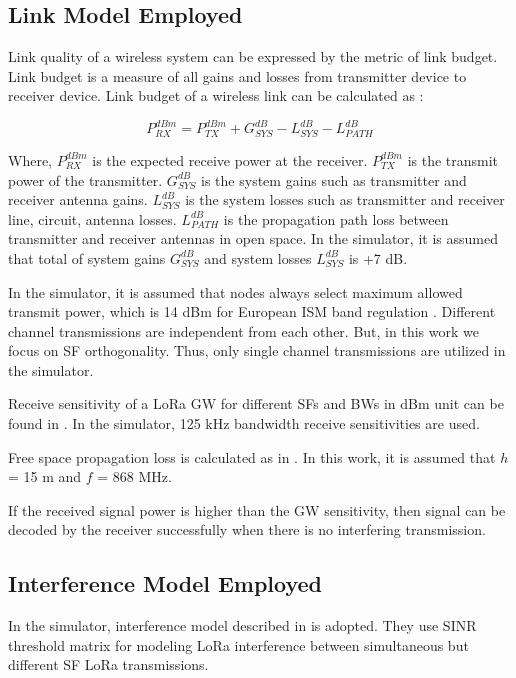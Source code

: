 \documentclass[conference]{IEEEtran}
\begin{document}
\subsection{Link Model Employed}
\par Link quality of a wireless system can be expressed by the metric of link budget. Link budget is a measure of all gains and losses from transmitter device to receiver device. Link budget of a wireless link can be calculated as \cite{AN1200.22}:

\begin{equation} \label{eq:expected_rx_power}
P^{dBm}_{RX} = P^{dBm}_{TX} + G^{dB}_{SYS} - L^{dB}_{SYS} - L^{dB}_{PATH}
\end{equation}

\par Where, $P^{dBm}_{RX}$ is the expected receive power at the receiver. $P^{dBm}_{TX}$ is the transmit power of the transmitter. $G^{dB}_{SYS}$ is the system gains such as transmitter and receiver antenna gains. $L^{dB}_{SYS}$ is the system losses such as transmitter and receiver line, circuit, antenna losses. $L^{dB}_{PATH}$ is the propagation path loss between transmitter and receiver antennas in open space. In the simulator, it is assumed that total of system gains $G^{dB}_{SYS}$ and system losses $L^{dB}_{SYS}$ is +7 dB.

\par In the simulator, it is assumed that nodes always select maximum allowed transmit power, which is 14 dBm for European ISM band regulation \cite{lorawan.regional.parameters}. Different channel transmissions are independent from each other. But, in this work we focus on SF orthogonality. Thus, only single channel transmissions are utilized in the simulator.

\par Receive sensitivity of a LoRa GW for different SFs and BWs in dBm unit can be found in \cite{SX1276}. In the simulator, 125 kHz bandwidth receive sensitivities are used.

\par Free space propagation loss is calculated as in \cite{TR136.942}. In this work, it is assumed that $h$ = 15 m and $f$ = 868 MHz.

\par If the received signal power is higher than the GW sensitivity, then signal can be decoded by the receiver successfully when there is no interfering transmission.

\subsection{Interference Model Employed}
\par In the simulator, interference model described in \cite{7996384} is adopted. They use SINR threshold matrix for modeling LoRa interference between simultaneous but different SF LoRa transmissions.
\end{document}
